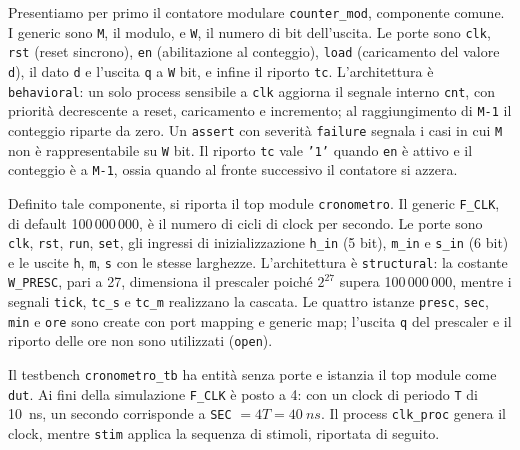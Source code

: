 \implementazione

Presentiamo per primo il contatore modulare \texttt{counter\_mod}, componente comune. I generic sono \texttt{M}, il modulo, e \texttt{W}, il numero di bit dell'uscita. Le porte sono \texttt{clk}, \texttt{rst} (reset sincrono), \texttt{en} (abilitazione al conteggio), \texttt{load} (caricamento del valore \texttt{d}), il dato \texttt{d} e l'uscita \texttt{q} a \texttt{W} bit, e infine il riporto \texttt{tc}. L'architettura è \texttt{behavioral}: un solo process sensibile a \texttt{clk} aggiorna il segnale interno \texttt{cnt}, con priorità decrescente a reset, caricamento e incremento; al raggiungimento di \texttt{M-1} il conteggio riparte da zero. Un \texttt{assert} con severità \texttt{failure} segnala i casi in cui \texttt{M} non è rappresentabile su \texttt{W} bit. Il riporto \texttt{tc} vale \texttt{'1'} quando \texttt{en} è attivo e il conteggio è a \texttt{M-1}, ossia quando al fronte successivo il contatore si azzera.


Definito tale componente, si riporta il top module \texttt{cronometro}. Il generic \texttt{F\_CLK}, di default 100\,000\,000, è il numero di cicli di clock per secondo. Le porte sono \texttt{clk}, \texttt{rst}, \texttt{run}, \texttt{set}, gli ingressi di inizializzazione \texttt{h\_in} (5 bit), \texttt{m\_in} e \texttt{s\_in} (6 bit) e le uscite \texttt{h}, \texttt{m}, \texttt{s} con le stesse larghezze. L'architettura è \texttt{structural}: la costante \texttt{W\_PRESC}, pari a 27, dimensiona il prescaler poiché $2^{27}$ supera 100\,000\,000, mentre i segnali \texttt{tick}, \texttt{tc\_s} e \texttt{tc\_m} realizzano la cascata. Le quattro istanze \texttt{presc}, \texttt{sec}, \texttt{min} e \texttt{ore} sono create con port mapping e generic map; l'uscita \texttt{q} del prescaler e il riporto delle ore non sono utilizzati (\texttt{open}).


\simulazione

Il testbench \texttt{cronometro\_tb} ha entità senza porte e istanzia il top module come \texttt{dut}. Ai fini della simulazione \texttt{F\_CLK} è posto a 4: con un clock di periodo \texttt{T} di \SI{10}{ns}, un secondo corrisponde a \texttt{SEC} $= 4T = \SI{40}{ns}$. Il process \texttt{clk\_proc} genera il clock, mentre \texttt{stim} applica la sequenza di stimoli, riportata di seguito.

